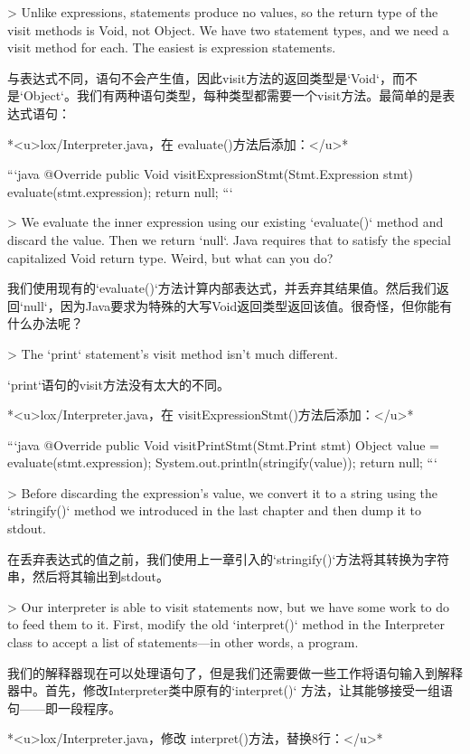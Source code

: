 \documentclass[cn,11pt,chinese]{elegantbook}
\begin{document}
{{{{> Unlike expressions, statements produce no values, so the return type of the visit methods is Void, not Object. We have two statement types, and we need a visit method for each. The easiest is expression statements.

与表达式不同，语句不会产生值，因此visit方法的返回类型是`Void`，而不是`Object`。我们有两种语句类型，每种类型都需要一个visit方法。最简单的是表达式语句：

*<u>lox/Interpreter.java，在 evaluate()方法后添加：</u>*

```java
  @Override
  public Void visitExpressionStmt(Stmt.Expression stmt) {
    evaluate(stmt.expression);
    return null;
  }
```

> We evaluate the inner expression using our existing `evaluate()` method and discard the value. Then we return `null`. Java requires that to satisfy the special capitalized Void return type. Weird, but what can you do?

我们使用现有的`evaluate()`方法计算内部表达式，并丢弃其结果值。然后我们返回`null`，因为Java要求为特殊的大写Void返回类型返回该值。很奇怪，但你能有什么办法呢？

> The `print` statement’s visit method isn’t much different.

`print`语句的visit方法没有太大的不同。

*<u>lox/Interpreter.java，在 visitExpressionStmt()方法后添加：</u>*

```java
  @Override
  public Void visitPrintStmt(Stmt.Print stmt) {
    Object value = evaluate(stmt.expression);
    System.out.println(stringify(value));
    return null;
  }
```

> Before discarding the expression’s value, we convert it to a string using the `stringify()` method we introduced in the last chapter and then dump it to stdout.

在丢弃表达式的值之前，我们使用上一章引入的`stringify()`方法将其转换为字符串，然后将其输出到stdout。

> Our interpreter is able to visit statements now, but we have some work to do to feed them to it. First, modify the old `interpret()` method in the Interpreter class to accept a list of statements—in other words, a program.

我们的解释器现在可以处理语句了，但是我们还需要做一些工作将语句输入到解释器中。首先，修改Interpreter类中原有的`interpret()` 方法，让其能够接受一组语句——即一段程序。

*<u>lox/Interpreter.java，修改 interpret()方法，替换8行：</u>*

}}}}
\end{document}
